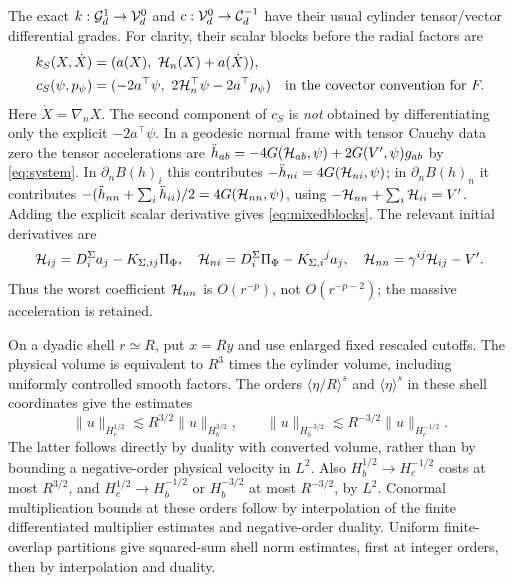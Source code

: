 The exact \(k:\mathcal G_d^1\to\mathcal V_d^0\) and \(c:\mathcal V_d^0\to\mathcal C_d^{-1}\) have their usual cylinder tensor/vector differential grades. For clarity, their scalar blocks before the radial factors are
\begin{align}
 k_S(X,\dot X)&=(a(X),\ \mathcal H_n(X)+a(\dot X)),\nonumber\\
 c_S(\psi,p_\psi)&=(-2a^\top\psi,\ 2\mathcal H_n^\top\psi-2a^\top p_\psi)
 \quad\text{in the covector convention for }F .
 \label{eq:mixedblocks}
\end{align}
Here \(\dot X=\nabla_nX\). The second component of \(c_S\) is \emph{not} obtained by differentiating only the explicit \(-2a^\top\psi\). In a geodesic normal frame with tensor Cauchy data zero the tensor accelerations are
\(\ddot h_{ab}=-4G(\mathcal H_{ab},\psi)+2G(V',\psi)g_{ab}\) by \eqref{eq:system}. In \(\partial_n B(h)_i\) this contributes \(-\ddot h_{ni}=4G(\mathcal H_{ni},\psi)\); in \(\partial_n B(h)_n\) it contributes \(-(\ddot h_{nn}+\sum_i\ddot h_{ii})/2=4G(\mathcal H_{nn},\psi)\), using \(-\mathcal H_{nn}+\sum_i\mathcal H_{ii}=V'\). Adding the explicit scalar derivative gives \eqref{eq:mixedblocks}. The relevant initial derivatives are
\begin{equation}
 \mathcal H_{ij}=D_i^\Sigma a_j-K_{\Sigma,ij}\Pi_\Phi,\quad
 \mathcal H_{ni}=D_i^\Sigma\Pi_\Phi-K_{\Sigma,i}{}^j a_j,\quad
 \mathcal H_{nn}=\gamma^{ij}\mathcal H_{ij}-V'.
 \label{eq:hess-end}
\end{equation}
Thus the worst coefficient \(\mathcal H_{nn}\) is \(O(r^{-p})\), not \(O(r^{-p-2})\); the massive acceleration is retained.

On a dyadic shell \(r\simeq R\), put \(x=Ry\) and use enlarged fixed rescaled cutoffs. The physical volume is equivalent to \(R^3\) times the cylinder volume, including uniformly controlled smooth factors. The orders \(\langle\eta/R\rangle^s\) and \(\langle\eta\rangle^s\) in these shell coordinates give the estimates
\begin{equation}
 \|u\|_{H_e^{1/2}}\lesssim R^{3/2}\|u\|_{H_b^{3/2}},\qquad
 \|u\|_{H_b^{-3/2}}\lesssim R^{-3/2}\|u\|_{H_e^{-1/2}} .
 \label{eq:transfer}
\end{equation}
The latter follows directly by duality with converted volume, rather than by bounding a negative-order physical velocity in \(L^2\). Also \(H_b^{1/2}\to H_e^{-1/2}\) costs at most \(R^{3/2}\), and \(H_e^{1/2}\to H_b^{-1/2}\) or \(H_b^{-3/2}\) at most \(R^{-3/2}\), by \(L^2\). Conormal multiplication bounds at these orders follow by interpolation of the finite differentiated multiplier estimates and negative-order duality. Uniform finite-overlap partitions give squared-sum shell norm estimates, first at integer orders, then by interpolation and duality.

